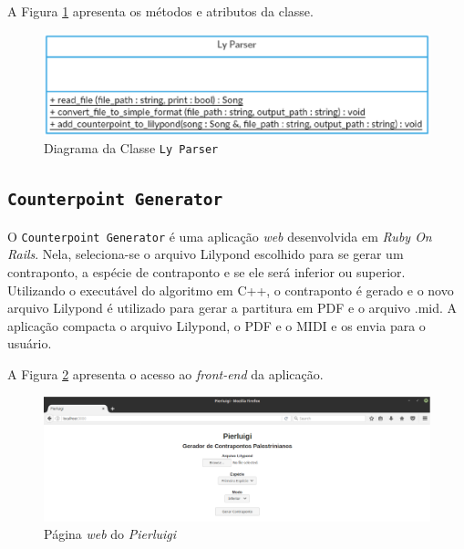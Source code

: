       A Figura \ref{lyparserclass} apresenta os métodos e atributos da classe.

      \begin{figure}[htb]
        \centering
        \includegraphics[scale=0.7]{figuras/lyparserclass.eps}
        \caption{Diagrama da Classe \texttt{Ly Parser}}
        \label{lyparserclass}
      \end{figure}

    \subsection[\texttt{Counterpoint Generator}]{\texttt{Counterpoint Generator}}

      O \texttt{Counterpoint Generator} é uma aplicação \textit{web} desenvolvida em \textit{Ruby On Rails}. Nela, seleciona-se o arquivo Lilypond escolhido para se gerar um contraponto, a espécie de contraponto e se ele será inferior ou superior. Utilizando o executável do algoritmo em C++, o contraponto é gerado e o novo arquivo Lilypond é utilizado para gerar a partitura em PDF e o arquivo .mid. A aplicação compacta o arquivo Lilypond, o PDF e o MIDI e os envia para o usuário.


            A Figura \ref{counterpointgenerator} apresenta o acesso ao \textit{front-end} da aplicação.

            \begin{figure}[htb]
              \centering
              \includegraphics[scale=0.45]{figuras/counterpointgenerator.eps}
              \caption{Página \textit{web} do \textit{Pierluigi}}
              \label{counterpointgenerator}
            \end{figure}

